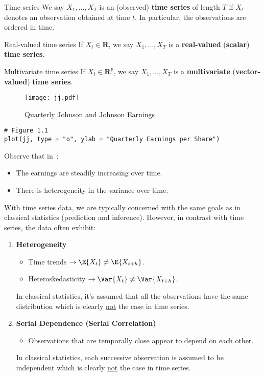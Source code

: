\begin{Definition}{Time series}{}
    We say $ X_1,\ldots,X_T $ is an (observed)
    \textbf{time series} of length $ T $ if $ X_t $
    denotes an observation obtained at time $ t $.
    In particular, the observations are ordered in time.
\end{Definition}
\begin{Definition}{Real-valued time series}{}
    If $ X_t\in\mathbf{R} $, we say $ X_1,\ldots,X_T $ is
    a \textbf{real-valued} (\textbf{scalar}) \textbf{time series}.
\end{Definition}
\begin{Definition}{Multivariate time series}{}
    If $ X_t\in\mathbf{R}^p $, we say $ X_1,\ldots,X_T $
    is a \textbf{multivariate} (\textbf{vector-valued})
    \textbf{time series}.
\end{Definition}

\begin{figure}[!htbp]
    \centering
    \texttt{[image: jj.pdf]}
    \caption{Quarterly Johnson and Johnson Earnings}\label{fig:jj}
\end{figure}
\begin{verbatim}
# Figure 1.1
plot(jj, type = "o", ylab = "Quarterly Earnings per Share")
\end{verbatim}
Observe that in~:
\begin{itemize}
    \item The earnings are steadily increasing over time.
    \item There is heterogeneity in the variance over time.
\end{itemize}

With time series data, we are typically concerned
with the same goals as in classical statistics (prediction and inference).
However, in contrast with time series, the data often exhibit:
\begin{enumerate}[(1)]
    \item \textbf{Heterogeneity}
          \begin{itemize}
              \item Time trends $ \rightarrow \E{X_t}\neq \E{X_{t+h}} $.
              \item Heteroskedasticity
                    $ \rightarrow \Var{X_t}\neq \Var{X_{t+h}} $.
          \end{itemize}
          {\color{blue}In classical statistics, it's assumed that all the observations have the
          same distribution which is clearly \underline{not} the case in time series.}
    \item \textbf{Serial Dependence (Serial Correlation)}
          \begin{itemize}
              \item Observations that are temporally close appear to depend
                    on each other.
          \end{itemize}
          {\color{blue}In classical statistics, each successive observation is assumed
          to be independent which is clearly \underline{not} the case in time series.}
\end{enumerate}

